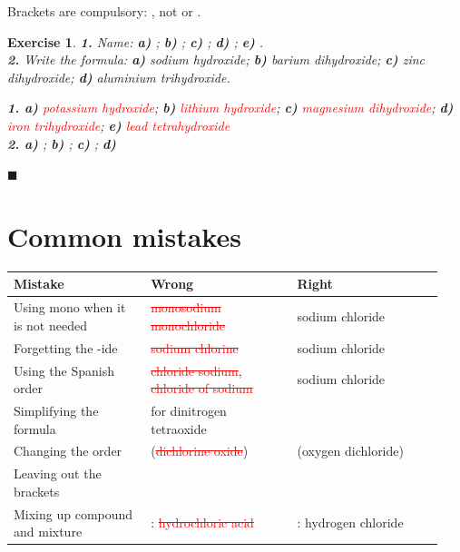 \documentclass[12pt]{article}
\theoremstyle{mygreennumbox}
\newtheorem{ejercicioT}{Exercise}[section]
\newenvironment{exercise}{\begin{eBoxmygreen}\begin{ejercicioT}}{\hfill{\color{mygreen}\tiny\ensuremath{\blacksquare}}\end{ejercicioT}\end{eBoxmygreen}}
\newcommand{\mal}[1]{\textcolor{red}{\sout{#1}}}
\begin{document}
\begin{marker}
    Brackets are compulsory: , not \mal{} or \mal{}.
\end{marker}

\begin{exercise}
    \textbf{1.} Name: \textbf{a)} ; \textbf{b)} ; \textbf{c)} ; \textbf{d)} ; \textbf{e)} .\\
    \textbf{2.} Write the formula: \textbf{a)} sodium hydroxide; \textbf{b)} barium dihydroxide; \textbf{c)} zinc dihydroxide; \textbf{d)} aluminium trihydroxide.
    \begin{solu}
        \textbf{1. a)} \textcolor{red}{potassium hydroxide}; \textbf{b)} \textcolor{red}{lithium hydroxide}; \textbf{c)} \textcolor{red}{magnesium dihydroxide}; \textbf{d)} \textcolor{red}{iron trihydroxide}; \textbf{e)} \textcolor{red}{lead tetrahydroxide}\\
        \textbf{2. a)} \textcolor{red}{}; \textbf{b)} \textcolor{red}{}; \textbf{c)} \textcolor{red}{}; \textbf{d)} \textcolor{red}{}
    \end{solu}
\end{exercise}

\section{Common mistakes}

\begin{center}
    \begin{tabular}{@{}L{0.3\linewidth} L{0.32\linewidth} L{0.32\linewidth}@{}}
        \toprule
        \textbf{Mistake} & \textbf{Wrong} & \textbf{Right} \\
        \midrule
        Using mono when it is not needed & \mal{monosodium monochloride} & sodium chloride \\[3pt]
        Forgetting the -ide & \mal{sodium chlorine} & sodium chloride \\[3pt]
        Using the Spanish order & \mal{chloride sodium}, \mal{chloride of sodium} & sodium chloride \\[3pt]
        Simplifying the formula & \mal{} for dinitrogen tetraoxide &  \\[3pt]
        Changing the order & \mal{} (\mal{dichlorine oxide}) &  (oxygen dichloride) \\[3pt]
        Leaving out the brackets & \mal{} &  \\[3pt]
        Mixing up compound and mixture & : \mal{hydrochloric acid} & : hydrogen chloride \\
        \bottomrule
    \end{tabular}
\end{center}
\end{document}
